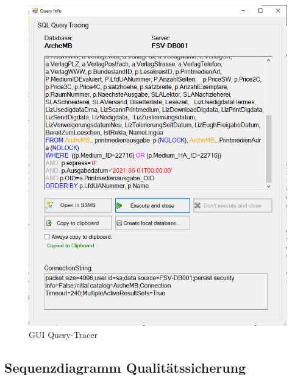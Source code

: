 \documentclass[11pt,toc=sectionentrywithoutdots, 
headheight=44pt, headings=optiontoheadandtoc, hyperfootnotes=false, hypertexnames=false]{scrartcl}
\begin{document}
 \begin{figure}[H]
 \centering

	\includegraphics[scale=0.9]{gui.png}
	 \caption{GUI Query-Tracer}
 \end{figure}
 \clearpage
 
 
 
 
   

    

 
\subsection{Sequenzdiagramm Qualitätssicherung}
 \label{fig:Sequenzdiagramm Entwicklung und Tests}
\end{document}
